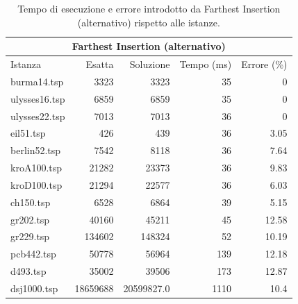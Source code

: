 \begin{table}[h!]
    \centering

    \begin{tabular}{lrrrr}
    \toprule
    \multicolumn{5}{c}{Farthest Insertion (alternativo)} \\
    \hline
     Istanza       &   Esatta &        Soluzione &   Tempo (ms) &   Errore (\%) \\
    \hline
 burma14.tsp   &     3323 &   3323           &           35 &         0    \\
 ulysses16.tsp &     6859 &   6859           &           35 &         0    \\
 ulysses22.tsp &     7013 &   7013           &           36 &         0    \\
 eil51.tsp     &      426 &    439           &           36 &         3.05 \\
 berlin52.tsp  &     7542 &   8118           &           36 &         7.64 \\
 kroA100.tsp   &    21282 &  23373           &           36 &         9.83 \\
 kroD100.tsp   &    21294 &  22577           &           36 &         6.03 \\
 ch150.tsp     &     6528 &   6864           &           39 &         5.15 \\
 gr202.tsp     &    40160 &  45211           &           45 &        12.58 \\
 gr229.tsp     &   134602 & 148324           &           52 &        10.19 \\
 pcb442.tsp    &    50778 &  56964           &          139 &        12.18 \\
 d493.tsp      &    35002 &  39506           &          173 &        12.87 \\
 dsj1000.tsp   & 18659688 &  20599827.0 &         1110 &        10.4  \\
    \bottomrule
    \end{tabular}

    \caption{Tempo di esecuzione e errore introdotto da Farthest Insertion (alternativo) rispetto alle istanze.}
    \label{table:farthest-insertion-alt-runtime-accuracy}
\end{table}

